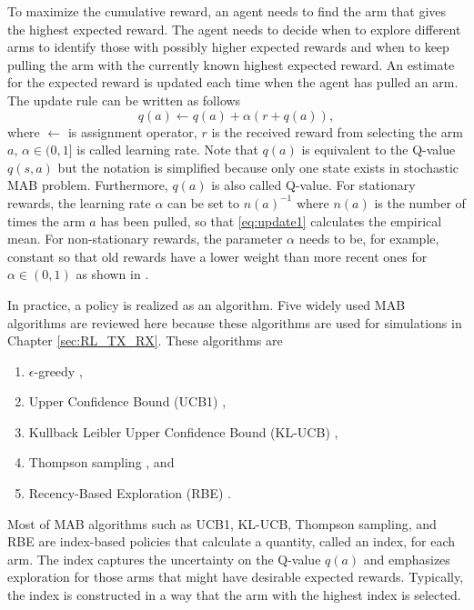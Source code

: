 \documentclass[english, 12pt, a4paper, elec, utf8, a-1b, online]{aaltothesis}
\numberwithin{equation}{section}
\begin{document}
To maximize the cumulative reward, an agent needs to find the arm that gives the highest expected reward.
The agent needs to decide when to explore different arms to identify those with possibly higher expected rewards and when to keep pulling the arm with the currently known highest expected reward.
An estimate for the expected reward is updated each time when the agent has pulled an arm.
The update rule can be written as follows
\begin{equation}\label{eq:update1}
    q(a) \leftarrow q(a) + \alpha \left(r + q(a)\right),
\end{equation}
where $\leftarrow$ is assignment operator, $r$ is the received reward from selecting the arm $a$, $\alpha \in (0, 1]$ is called learning rate.
Note that $q(a)$ is equivalent to the Q-value $q(s, a)$ but the notation is simplified because only one state exists in stochastic MAB problem.
Furthermore, $q(a)$ is also called Q-value.
For stationary rewards, the learning rate $\alpha$ can be set to $n(a)^{-1}$ where $n(a)$ is the number of times the arm $a$ has been pulled, so that \eqref{eq:update1} calculates the empirical mean. 
For non-stationary rewards, the parameter $\alpha$ needs to be, for example, constant so that old rewards have a lower weight than more recent ones for $\alpha \in (0, 1)$ as shown in \cite{Sutton2018}.

In practice, a policy is realized as an algorithm.
Five widely used MAB algorithms are reviewed here because these algorithms are used for simulations in Chapter \ref{sec:RL_TX_RX}.
These algorithms are
\begin{enumerate}
    \item $\epsilon$-greedy \cite{Sutton2018},
    \item Upper Confidence Bound (UCB1) \cite{Auer2002, Garivier2008},
    \item Kullback Leibler Upper Confidence Bound (KL-UCB) \cite{Garivier2011},
    \item Thompson sampling \cite{Agrawal2012, Raj2017}, and
    \item Recency-Based Exploration (RBE) \cite{Oksanen2015,Oksanen2017}.
\end{enumerate}
Most of MAB algorithms such as UCB1, KL-UCB, Thompson sampling, and RBE are index-based policies that calculate a quantity, called an index, for each arm. 
The index captures the uncertainty on the Q-value $q(a)$ and emphasizes exploration for those arms that might have desirable expected rewards. 
Typically, the index is constructed in a way that the arm with the highest index is selected.
\end{document}
